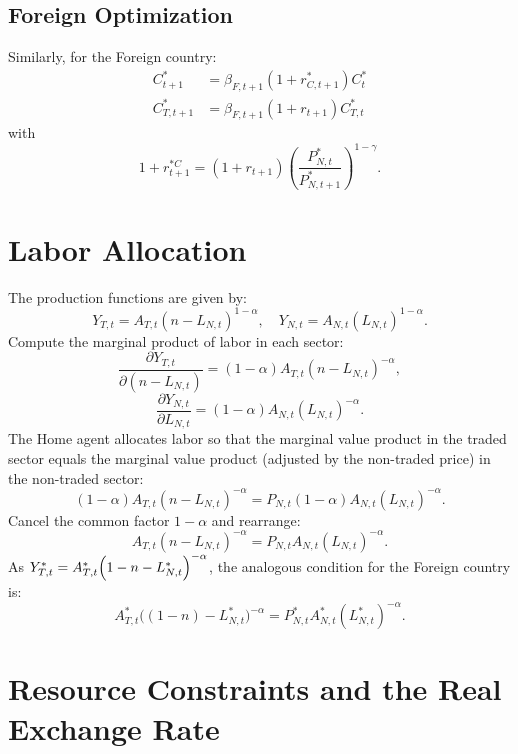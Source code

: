 \documentclass[a4paper,12pt]{article} %
\theoremstyle{nonitalic}
\begin{document}
\subsection*{Foreign Optimization}
Similarly, for the Foreign country:
\begin{align*}
    C_{t+1}^* &= \beta_{F,t+1} (1+r_{C,t+1}^*) C_t^* \tag{3d} \\
    C^*_{T,t+1} &= \beta_{F,t+1} (1+r_{t+1}) C^*_{T,t} \tag{3e}
\end{align*}
with
\[
1+r_{t+1}^{*C} = (1+r_{t+1}) \left(\frac{P^*_{N,t}}{P^*_{N,t+1}}\right)^{1-\gamma}. \tag{3f}
\]

\section{Labor Allocation}

The production functions are given by:
\[
Y_{T,t} = A_{T,t}(n-L_{N,t})^{1-\alpha}, \quad Y_{N,t} = A_{N,t}(L_{N,t})^{1-\alpha}.
\]
Compute the marginal product of labor in each sector:
\[
\frac{\partial Y_{T,t}}{\partial (n-L_{N,t})} = (1-\alpha) A_{T,t}(n-L_{N,t})^{-\alpha},
\]
\[
\frac{\partial Y_{N,t}}{\partial L_{N,t}} = (1-\alpha) A_{N,t}(L_{N,t})^{-\alpha}.
\]
The Home agent allocates labor so that the marginal value product in the traded sector equals the marginal value product (adjusted by the non-traded price) in the non-traded sector:
\[
(1-\alpha)A_{T,t}(n-L_{N,t})^{-\alpha} = P_{N,t} (1-\alpha)A_{N,t}(L_{N,t})^{-\alpha}.
\]
Cancel the common factor \(1-\alpha\) and rearrange:
\[
A_{T,t}(n-L_{N,t})^{-\alpha} = P_{N,t} A_{N,t}(L_{N,t})^{-\alpha}. \tag{4a}
\]
As $Y_{T,t}^* = A_{T,t}^* \Bigl(1-n-L_{N,t}^* \Bigr)^{-\alpha}$, the analogous condition for the Foreign country is:
\[
A_{T,t}^*\big((1-n)-L_{N,t}^*\big)^{-\alpha} = P_{N,t}^* A_{N,t}^*(L_{N,t}^*)^{-\alpha}. \tag{4b}
\]

\section{Resource Constraints and the Real Exchange Rate}
\end{document}
